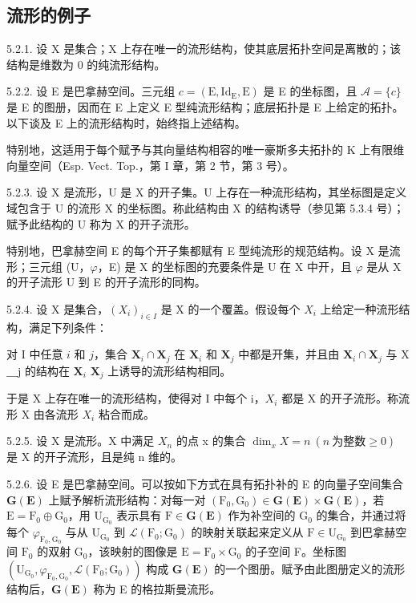 \subsection{流形的例子}

5.2.1. 设 X 是集合；X 上存在唯一的流形结构，使其底层拓扑空间是离散的；该结构是维数为 0 的纯流形结构。

5.2.2. 设 E 是巴拿赫空间。三元组 \(c = (\mathrm{E}, \mathrm{Id}_{\mathrm{E}}, \mathrm{E})\) 是 E 的坐标图，且 \(\mathcal{A} = \{c\}\) 是 E 的图册，因而在 E 上定义 E 型纯流形结构；底层拓扑是 E 上给定的拓扑。以下谈及 E 上的流形结构时，始终指上述结构。

特别地，这适用于每个赋予与其向量结构相容的唯一豪斯多夫拓扑的 K 上有限维向量空间（Esp. Vect. Top.，第 I 章，第 2 节，第 3 号）。

5.2.3. 设 X 是流形，U 是 X 的开子集。U 上存在一种流形结构，其坐标图是定义域包含于 U 的流形 X 的坐标图。称此结构由 X 的结构诱导（参见第 5.3.4 号）；赋予此结构的 U 称为 X 的开子流形。

特别地，巴拿赫空间 E 的每个开子集都赋有 E 型纯流形的规范结构。设 X 是流形；三元组 (U，\(\varphi\)，E) 是 X 的坐标图的充要条件是 U 在 X 中开，且 \(\varphi\) 是从 X 的开子流形 U 到 E 的开子流形的同构。

5.2.4. 设 X 是集合，\((X_{i})_{i\in I}\) 是 X 的一个覆盖。假设每个 \(X_{i}\) 上给定一种流形结构，满足下列条件：

对 I 中任意 \(i\) 和 \(j\)，集合 \(\mathbf{X}_{i} \cap \mathbf{X}_{j}\) 在 \(\mathbf{X}_{i}\) 和 \(\mathbf{X}_{j}\) 中都是开集，并且由 \(\mathbf{X}_{i} \cap \mathbf{X}_{j}\) 与 X＿j 的结构在 \(\mathbf{X}_{i}\)  \(\mathbf{X}_{j}\) 上诱导的流形结构相同。

于是 X 上存在唯一的流形结构，使得对 I 中每个 i，\(X_{i}\) 都是 X 的开子流形。称流形 X 由各流形 \(X_{i}\) 粘合而成。

5.2.5. 设 X 是流形。X 中满足 \(X_{n}\) 的点 x 的集合 \(\dim_{x}X=n\ (n\ \text{为整数}\geqslant0)\) 是 X 的开子流形，且是纯 n 维的。

5.2.6. 设 E 是巴拿赫空间。可以按如下方式在具有拓扑补的 E 的向量子空间集合 \(\mathbf{G}(\mathbf{E})\) 上赋予解析流形结构：对每一对 \((\mathrm{F}_0, \mathrm{G}_0) \in \mathbf{G}(\mathbf{E}) \times \mathbf{G}(\mathbf{E})\)，若 \(\mathrm{E} = \mathrm{F}_0 \oplus \mathrm{G}_0\)，用 \(\mathrm{U}_{\mathrm{G}_0}\) 表示具有 \(\mathrm{F} \in \mathbf{G}(\mathbf{E})\) 作为补空间的 \(\mathrm{G}_0\) 的集合，并通过将每个 \(\varphi_{\mathrm{F}_0, \mathrm{G}_0}\) 与从 \(\mathrm{U}_{\mathrm{G}_0}\) 到 \(\mathcal{L}(\mathrm{F}_0; \mathrm{G}_0)\) 的映射关联起来定义从 \(\mathrm{F} \in \mathrm{U}_{\mathrm{G}_0}\) 到巴拿赫空间 \(\mathrm{F}_0\) 的双射 \(\mathrm{G}_0\)，该映射的图像是 \(\mathrm{E} = \mathrm{F}_0 \times \mathrm{G}_0\) 的子空间 F。坐标图 \((\mathrm{U}_{\mathrm{G}_0}, \varphi_{\mathrm{F}_0, \mathrm{G}_0}, \mathcal{L}(\mathrm{F}_0; \mathrm{G}_0))\) 构成 \(\mathbf{G}(\mathbf{E})\) 的一个图册。赋予由此图册定义的流形结构后，\(\mathbf{G}(\mathbf{E})\) 称为 E 的格拉斯曼流形。


